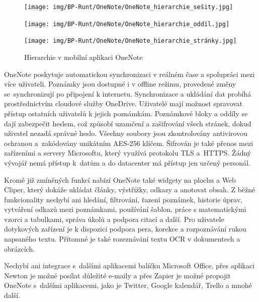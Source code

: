 \documentclass[czech, bc, kiv, he, iso690numb]{fasthesis}
\begin{document}
\begin{figure}[h!]
  \centering
  \begin{minipage}[h]{0.3\textwidth}
    \texttt{[image: img/BP-Runt/OneNote/OneNote\_hierarchie\_sešity.jpg]}
  \end{minipage}
  \hfill
  \begin{minipage}[h]{0.3\textwidth}
    \texttt{[image: img/BP-Runt/OneNote/OneNote\_hierarchie\_oddíl.jpg]}
  \end{minipage}
  \hfill
  \begin{minipage}[h]{0.3\textwidth}
    \texttt{[image: img/BP-Runt/OneNote/OneNote\_hierarchie\_stránky.jpg]}
  \end{minipage}
  \caption{Hierarchie v mobilní aplikaci OneNote}
  \label{fig:hierarchie_OneNote}
\end{figure}

OneNote poskytuje automatickou synchronizaci v reálném čase a spolupráci mezi více uživateli. Poznámky jsou dostupné i v offline režimu, provedené změny se~synchronizují po připojení k internetu. Synchronizace a ukládání dat probíhá prostřednictvím cloudové služby OneDrive. Uživatelé mají možnost spravovat přístup ostatních uživatelů k jejich poznámkám. Poznámkové bloky a oddíly se dají zabezpečit heslem, což způsobí uzamčení a zašifrování všech stránek, dokud uživatel nezadá správné heslo. Všechny soubory jsou zkontrolovány antivirovou ochranou a~zakódovány unikátním \gls{AES}-256 klíčem. Šifrován je také přenos mezi zařízeními a servery Microsoftu, který využívá protokolu \gls{TLS} a~\gls{HTTPS}. Žádný vývojář nemá přístup k~datům a do datacenter má přístup jen určený personál.

Kromě již zmíněných funkcí nabízí OneNote také widgety na plochu a Web Cliper, který dokáže ukládat články, výstřižky, odkazy a anotovat obsah. Z běžné funkcionality nechybí ani hledání, filtrování, řazení poznámek, historie úprav, vytváření odkazů mezi poznámkami, používání šablon, práce s matematickými vzorci a tabulkami, správa úkolů a podpora citací a další. Pro uživatele dotykových zařízení je k dispozici podpora pera, korekce a rozpoznávání rukou napsaného textu. Přítomné je také rozeznávání textu \gls{OCR} v dokumentech a obrázcích.

Nechybí ani integrace s~dalšími aplikacemi balíčku Microsoft Office, přes aplikaci Newton je možné posílat důležité e-maily a přes Zapier je možné propojit OneNote s~dalšími aplikacemi, jako je Twitter, Google kalendář, Trello a mnohé další.
\end{document}
